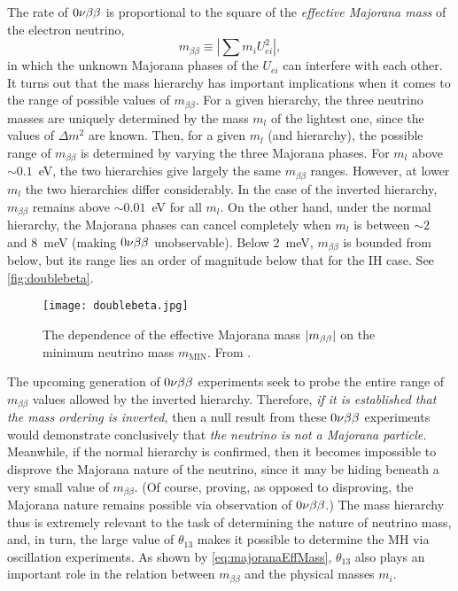 \documentclass[../thesis.tex]{subfiles}
\begin{document}
The rate of $0\nu\beta\beta$ is proportional to the square of the \emph{effective Majorana mass} of the electron neutrino,
\begin{equation}
  m_{\beta\beta} \equiv \left| \sum m_i U^2_{ei} \right|,
  \label{eq:majoranaEffMass}
\end{equation}
in which the unknown Majorana phases of the $U_{ei}$ can interfere with each other. It turns out that the mass hierarchy has important implications when it comes to the range of possible values of $m_{\beta\beta}$. For a given hierarchy, the three neutrino masses are uniquely determined by the mass $m_l$ of the lightest one, since the values of $\Delta m^2$ are known. Then, for a given $m_l$ (and hierarchy), the possible range of $m_{\beta\beta}$ is determined by varying the three Majorana phases. For $m_l$ above $\sim0.1$~eV, the two hierarchies give largely the same $m_{\beta\beta}$ ranges. However, at lower $m_l$ the two hierarchies differ considerably. In the case of the inverted hierarchy, $m_{\beta\beta}$ remains above $\sim0.01$~eV for all $m_l$. On the other hand, under the normal hierarchy, the Majorana phases can cancel completely when $m_l$ is between $\sim2$ and 8~meV (making $0\nu\beta\beta$ unobservable). Below 2~meV, $m_{\beta\beta}$ is bounded from below, but its range lies an order of magnitude below that for the IH case. See \autoref{fig:doublebeta}.

\begin{figure}[h]
  \texttt{[image: doublebeta.jpg]}
  \caption{The dependence of the effective Majorana mass $\lvert m_{\beta\beta}\rvert$ on the minimum neutrino mass $m_{\mathrm{MIN}}$. From \cite{giuliani2020double}.}
  \label{fig:doublebeta}
\end{figure}


The upcoming generation of $0\nu\beta\beta$ experiments seek to probe the entire range of $m_{\beta\beta}$ values allowed by the inverted hierarchy. Therefore, \emph{if it is established that the mass ordering is inverted,} then a null result from these $0\nu\beta\beta$ experiments would demonstrate conclusively that \emph{the neutrino is not a Majorana particle.} Meanwhile, if the normal hierarchy is confirmed, then it becomes impossible to disprove the Majorana nature of the neutrino, since it may be hiding beneath a very small value of $m_{\beta\beta}$. (Of course, proving, as opposed to disproving, the Majorana nature remains possible via observation of $0\nu\beta\beta$.) The mass hierarchy thus is extremely relevant to the task of determining the nature of neutrino mass, and, in turn, the large value of $\theta_{13}$ makes it possible to determine the MH via oscillation experiments. As shown by \autoref{eq:majoranaEffMass}, $\theta_{13}$ also plays an important role in the relation between $m_{\beta\beta}$ and the physical masses $m_i$.
\end{document}
